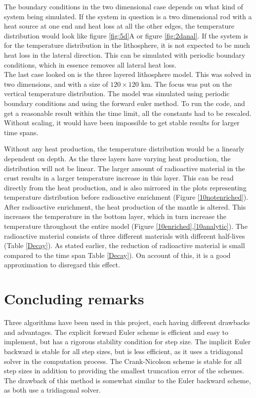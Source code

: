 \documentclass[10pt,a4paper]{article}
\begin{document}
\noindent The boundary conditions in the two dimensional case depends on what kind of system being simulated. If the system in question is a two dimensional rod with a heat source at one end and heat loss at all the other edges, the temperature distribution would look like figure \ref{fig:5d}A or figure \ref{fig:2danal}. If the system is for the temperature distribution in the lithosphere, it is not expected to be much heat loss in the lateral direction. This can be simulated with periodic boundary conditions, which in essence removes all lateral heat loss. 
\\

\noindent The last case looked on is the three layered lithosphere model. This was solved in two dimensions, and with a size of $120 \times 120$ km. The focus was put on the vertical temperature distribution. The model was simulated using periodic boundary conditions and using the forward euler method. To run the code, and get a reasonable result within the time limit, all the constants had to be rescaled. Without scaling, it would have been impossible to get stable results for larger time spans.   



\noindent Without any heat production, the temperature distribution would be a linearly dependent on depth. As the three layers have varying heat production, the distribution will not be linear. The larger amount of radioactive material in the crust results in a larger temperature increase in this layer. This can be read directly from the heat production, and is also mirrored in the plots representing temperature distribution before radioactive enrichment (Figure \ref{10notenriched}).\\ 


\noindent After radioactive enrichment, the heat production of the mantle is altered. This increases the temperature in the bottom layer, which in turn increase the temperature throughout the entire model (Figure \ref{10enriched},\ref{10analytic}). The radioactive material consists of three different materials with different half-lives (Table \ref{Decay}). As stated earlier, the reduction of radioactive material is small compared to the time span Table \ref{Decay}). On account of this, it is a good approximation to disregard this effect.  



\newpage
\section*{Concluding remarks}
Three algorithms have been used in this project, each having different drawbacks and advantages. The explicit forward Euler scheme is efficient and easy to implement, but has a rigorous stability condition for step size. The implicit Euler backward is stable for all step sizes, but is less efficient, as it uses a tridiagonal solver in the computation process. The Crank-Nicolson scheme is stable for all step sizes in addition to providing the smallest truncation error of the schemes. The drawback of this method is somewhat similar to the Euler backward scheme, as both use a tridiagonal solver.\\ 
\end{document}

